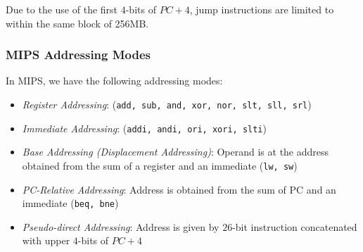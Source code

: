\begin{remark}
  Due to the use of the first $4$-bits of $PC+4$, jump instructions are limited to within
  the same block of 256MB.
\end{remark}

\subsubsection{MIPS Addressing Modes}
In MIPS, we have the following addressing modes:
\begin{itemize}
  \item \textit{Register Addressing}: (\verb|add, sub, and, xor, nor, slt, sll, srl|)
  \item \textit{Immediate Addressing}: (\verb|addi, andi, ori, xori, slti|)
  \item \textit{Base Addressing (Displacement Addressing)}: Operand is at the
  address obtained from the sum of a register and an immediate (\verb|lw, sw|)
  \item \textit{PC-Relative Addressing}: Address is obtained from the sum of PC
  and an immediate (\verb|beq, bne|)
  \item \textit{Pseudo-direct Addressing}: Address is given by $26$-bit instruction
    concatenated with upper $4$-bits of $PC+4$
\end{itemize}
